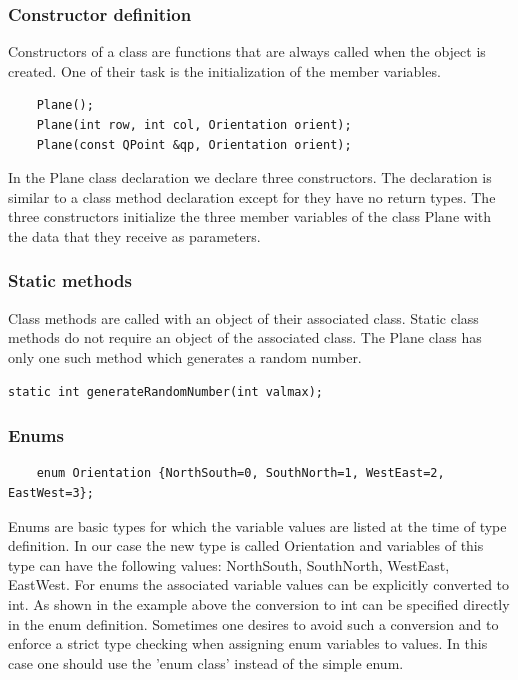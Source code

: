 \documentclass{article}
\begin{document}
\subsubsection {Constructor definition}
Constructors of a class are functions that are always called when the object is created. One of their task is the initialization of the member variables.
\begin{lstlisting}
    Plane();
    Plane(int row, int col, Orientation orient);
    Plane(const QPoint &qp, Orientation orient);
\end{lstlisting}
In the Plane class declaration we declare three constructors. The declaration is similar to a class method declaration except for they have no return types. The three constructors initialize the three member variables of the class Plane with the data that they receive as parameters. 

\subsubsection {Static methods}
Class methods are called with an object of their associated class. Static class methods do not require an object of the associated class. The Plane class has only one such method which generates a random number.
\begin{lstlisting}
static int generateRandomNumber(int valmax);
\end{lstlisting}

\subsubsection {Enums}

\begin{lstlisting}
    enum Orientation {NorthSouth=0, SouthNorth=1, WestEast=2, EastWest=3};
\end{lstlisting}
Enums are basic types for which the variable values are listed at the time of type definition. In our case the new type is called Orientation and variables of this type can have the following values: NorthSouth, SouthNorth, WestEast, EastWest. For enums the associated variable values can be explicitly converted to int. As shown in the example above the conversion to int can be specified directly in the enum definition. Sometimes one desires to avoid such a conversion and to enforce a strict type checking when assigning enum variables to values. In this case one should use the 'enum class' instead of the simple enum.  
\end{document}
